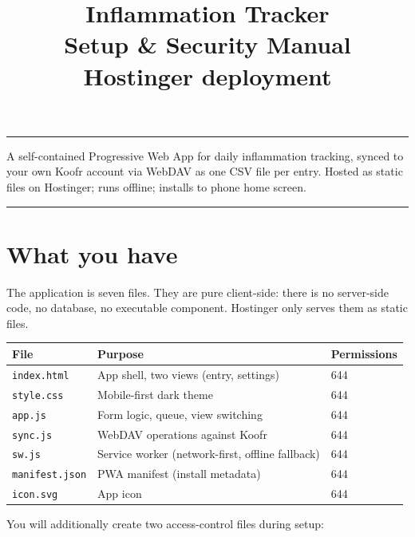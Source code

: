 \documentclass[11pt,a4paper]{article}
\title{\vspace{-1.5cm}\textbf{Inflammation Tracker}\\[4pt]\Large Setup \& Security Manual\\[2pt]\normalsize Hostinger deployment}
\author{}
\date{}
\begin{document}
\maketitle
\thispagestyle{fancy}
\vspace{-2.5em}

{\small\color{gray}\hrule\vspace{4pt}A self-contained Progressive Web App for daily inflammation tracking, synced to your own Koofr account via WebDAV as one CSV file per entry. Hosted as static files on Hostinger; runs offline; installs to phone home screen.\vspace{4pt}\hrule}

\vspace{1em}

\tableofcontents

\section{What you have}

The application is seven files. They are pure client-side: there is no server-side code, no database, no executable component. Hostinger only serves them as static files.

\begin{center}
\small
\begin{tabular}{lll}
\textbf{File} & \textbf{Purpose} & \textbf{Permissions} \\ \hline
\texttt{index.html}    & App shell, two views (entry, settings) & 644 \\
\texttt{style.css}     & Mobile-first dark theme                 & 644 \\
\texttt{app.js}        & Form logic, queue, view switching       & 644 \\
\texttt{sync.js}       & WebDAV operations against Koofr         & 644 \\
\texttt{sw.js}         & Service worker (network-first, offline fallback) & 644 \\
\texttt{manifest.json} & PWA manifest (install metadata)         & 644 \\
\texttt{icon.svg}      & App icon                                & 644 \\
\end{tabular}
\end{center}

You will additionally create two access-control files during setup:
\end{document}
